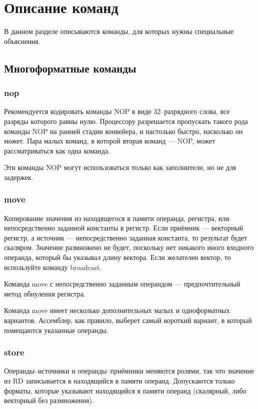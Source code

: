\documentclass[forwardcom.tex]{subfiles}
\begin{document}
\section{Описание команд}
В данном разделе описываются команды, для которых нужны специальные объяснения.

\subsection{Многоформатные команды}
\subsubsection{nop}
Рекомендуется кодировать команды NOP в виде 32--разрядного слова, все разряды которого равны нулю. Процессору разрешается пропускать такого рода команды NOP на ранней стадии конвейера, и настолько быстро, насколько он может. Пара малых команд, в которой вторая команд --- NOP, может рассматриваться как одна команда.

Эти команды NOP могут использоваться только как заполнители, но не для задержек.

\subsubsection{move}
Копирование значения из находящегося в памяти операнда, регистра, или непосредственно заданной константы в регистр. Если приёмник --- векторный регистр, а источник --- непосредственно заданная константа, то результат будет скаляром. Значение размножено не будет, поскольку нет никакого иного входного операнда, который бы указывал длину вектора. Если желателен вектор, то используйте команду broadcast.

Команда move с непосредственно заданным операндом  --- предпочтительный метод обнуления регистра.

Команда move  имеет несколько дополнительных малых и одноформатных вариантов. Ассемблер, как правило, выберет самый короткий вариант, в который помещаются указанные операнды.

\subsubsection{store}
Операнды--источники и операнды--приёмники меняются ролями, так что значение из RD записывается в находящийся в памяти операнд. Допускаются только форматы, которые указывают находящийся в памяти операнд (скалярный, либо векторный без размножения).
\end{document}
